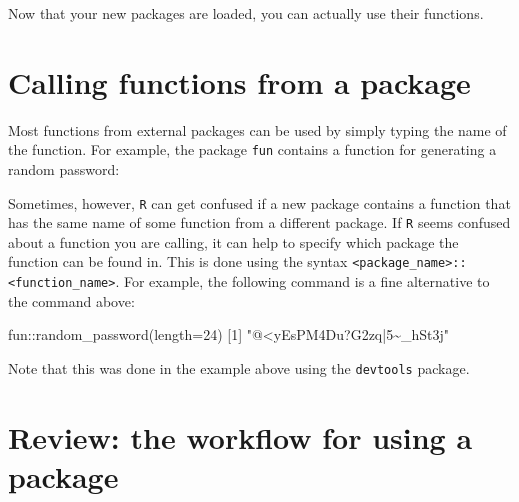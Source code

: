 \documentclass[
]{book}
\newenvironment{Shaded}{\begin{snugshade}}{\end{snugshade}}
\newcommand{\AttributeTok}[1]{\textcolor[rgb]{0.77,0.63,0.00}{#1}}
\newcommand{\DecValTok}[1]{\textcolor[rgb]{0.00,0.00,0.81}{#1}}
\newcommand{\FunctionTok}[1]{\textcolor[rgb]{0.00,0.00,0.00}{#1}}
\newcommand{\NormalTok}[1]{#1}
\newcommand{\SpecialCharTok}[1]{\textcolor[rgb]{0.00,0.00,0.00}{#1}}
\newcommand{\StringTok}[1]{\textcolor[rgb]{0.31,0.60,0.02}{#1}}
\begin{document}
Now that your new packages are loaded, you can actually use their functions.

\hypertarget{calling-functions-from-a-package}{%
\section*{Calling functions from a package}\label{calling-functions-from-a-package}}

Most functions from external packages can be used by simply typing the name of the function. For example, the package \texttt{fun} contains a function for generating a random password:

\begin{Shaded}
\end{Shaded}

Sometimes, however, \texttt{R} can get confused if a new package contains a function that has the same name of some function from a different package. If \texttt{R} seems confused about a function you are calling, it can help to specify which package the function can be found in. This is done using the syntax \texttt{\textless{}package\_name\textgreater{}::\textless{}function\_name\textgreater{}}. For example, the following command is a fine alternative to the command above:

\begin{Shaded}
\begin{Highlighting}[]
\NormalTok{fun}\SpecialCharTok{::}\FunctionTok{random\_password}\NormalTok{(}\AttributeTok{length=}\DecValTok{24}\NormalTok{)}
\NormalTok{[}\DecValTok{1}\NormalTok{] }\StringTok{"@\textless{}yEsPM4Du?G2zq|5\textasciitilde{}\_hSt3j"}
\end{Highlighting}
\end{Shaded}

Note that this was done in the example above using the \texttt{devtools} package.

\hypertarget{review-the-workflow-for-using-a-package}{%
\section*{Review: the workflow for using a package}\label{review-the-workflow-for-using-a-package}}
\end{document}

